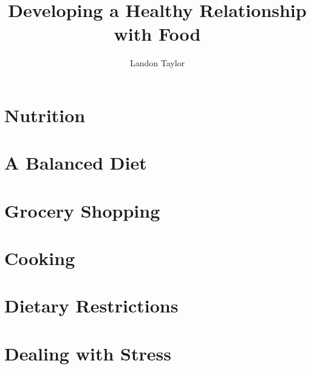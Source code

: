 \documentclass[14pt,letterpaper,oneside]{book} %
\title{Developing a Healthy Relationship with Food}
\author{Landon Taylor}
\date{}
\begin{document}
	
	\frontmatter
	
	\maketitle
	\tableofcontents
	
	\mainmatter
	
	\part{Nutrition}
	
	
	\part{A Balanced Diet}
	
	
	\part{Grocery Shopping}
	
	
	\part{Cooking}
	
	
	\part{Dietary Restrictions}
	
	
	\part{Dealing with Stress}
	
	
	
\end{document}

